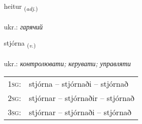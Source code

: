 \documentclass[frontgrid, backgrid]{flacards}\usepackage[]{graphicx}\usepackage[]{xcolor}
\begin{document}
\renewcommand{\flhead}{\vskip5pt \fboxsep=0pt {\small\bfseries\footnotesize Lýsingarorð | прикметник}}
\renewcommand{\fcfoot}{\vskip5pt \fboxsep=0pt \hspace{2pt}{\small\bfseries\footnotesize 1K}}

\renewcommand{\blhead}{\vskip5pt {\small\bfseries\footnotesize Lýsingarorð | прикметник }}
\renewcommand{\bcfoot}{\vskip5pt \hspace{2pt}{\small\bfseries\footnotesize 1K}}


{heitur \small{\textsubscript{(\textit{adj.})}} \\[1ex] %
\textphonetic{[heiːtʏr]} \\
ukr.: \emph{гарячий} \\  [2ex]
\renewcommand*{\arraystretch}{0.8}
}

\renewcommand{\flhead}{\vskip5pt \fboxsep=0pt {\small\bfseries\footnotesize Sagnorð | дієслово}}
\renewcommand{\fcfoot}{\vskip5pt \fboxsep=0pt \hspace{2pt}{\small\bfseries\footnotesize 1K}}

\renewcommand{\blhead}{\vskip5pt {\small\bfseries\footnotesize Sagnorð | дієслово }}
\renewcommand{\bcfoot}{\vskip5pt \hspace{2pt}{\small\bfseries\footnotesize 1K}}


{stjórna \small{\textsubscript{(\textit{v.})}} \\[1ex] %
\textphonetic{[stjourtna]} \\
ukr.: \emph{контролювати; керувати; управляти} \\  [2ex]
\renewcommand*{\arraystretch}{0.8}
\begin{tabular}{p{1cm}l}
\textsc{1sg}: & stjórna -- stjórnaði -- stjórnað \\ 
\textsc{2sg}: & stjórnar -- stjórnaðir -- stjórnað \\ 
\textsc{3sg}: & stjórnar -- stjórnaði -- stjórnað \\ 
\end{tabular}
}
\end{document}
